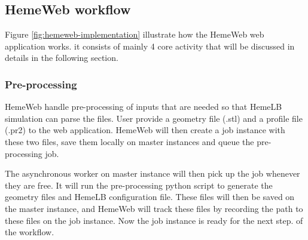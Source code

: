 \subsection{HemeWeb workflow}

\vspace{1cm}

\noindent%
\begin{minipage}{\linewidth}%
\label{fig:hemeweb-implementation}%
\end{minipage}

\vspace{1cm}

Figure \ref{fig:hemeweb-implementation} illustrate how the HemeWeb web application works. it consists of mainly 4 core activity that will be discussed in details in the following section.

\subsubsection{Pre-processing}

HemeWeb handle pre-processing of inputs that are needed so that HemeLB simulation can parse the files. User provide a geometry file (.stl) and a profile file (.pr2) to the web application. HemeWeb will then create a job instance with these two files, save them locally on master instances and queue the pre-processing job.

The asynchronous worker on master instance will then pick up the job whenever they are free. It will run the pre-processing python script to generate the geometry files and HemeLB configuration file. These files will then be saved on the master instance, and HemeWeb will track these files by recording the path to these files on the job instance. Now the job instance is ready for the next step. of the workflow.

